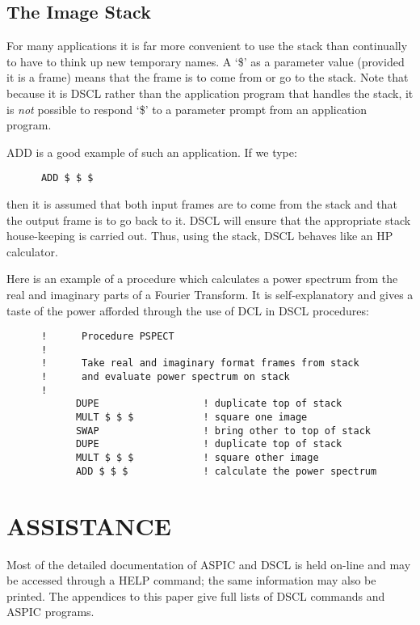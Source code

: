 \subsection {The Image Stack}
For many applications it is far more convenient to use the stack than
continually to have to think up new temporary names.
A `\$' as a parameter value (provided it is a frame) means that
the frame is to come from or go to the stack.
Note that because it is DSCL rather than the application program that handles
the stack, it is {\em not} possible to respond `\$' to a parameter prompt from
an application program.

ADD is a good example of such an application.
If we type:
\begin{verbatim}
      ADD $ $ $
\end{verbatim}
then it is assumed that both input frames are to come from the stack and that
the output frame is to go back to it.
DSCL will ensure that the appropriate stack house-keeping is carried out.
Thus, using the stack, DSCL behaves like an HP calculator.

Here is an example of a procedure which calculates a power spectrum from the
real and imaginary parts of a Fourier Transform.
It is self-explanatory and gives a taste of the power afforded through the use
of DCL in DSCL procedures:
\begin{verbatim}
      !      Procedure PSPECT
      !
      !      Take real and imaginary format frames from stack
      !      and evaluate power spectrum on stack
      !
            DUPE                  ! duplicate top of stack
            MULT $ $ $            ! square one image
            SWAP                  ! bring other to top of stack
            DUPE                  ! duplicate top of stack
            MULT $ $ $            ! square other image
            ADD $ $ $             ! calculate the power spectrum
\end{verbatim}

\section {ASSISTANCE}

Most of the detailed documentation of ASPIC and DSCL is held on-line and may be
accessed through a HELP command; the same information may also be printed.
The appendices to this paper give full lists of DSCL commands and ASPIC
programs.
